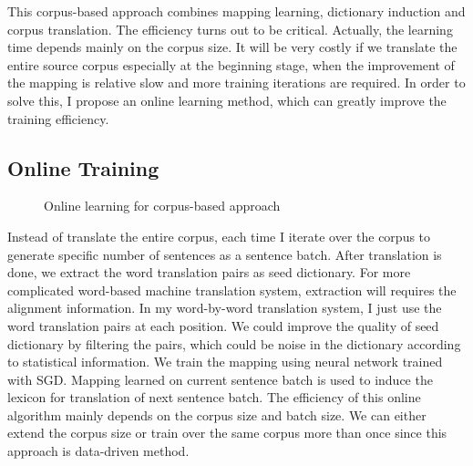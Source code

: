 
This corpus-based approach combines mapping learning, dictionary induction and corpus translation. The efficiency turns out to be critical. Actually, the learning time depends mainly on the corpus size. It will be very costly if we translate the entire source corpus especially at the beginning stage, when the improvement of the mapping is relative slow and more training iterations are required. In order to solve this, I propose an online learning method, which can greatly improve the training efficiency. 

\subsection{Online Training}

\begin{figure}[H]
	\centering
	\begin{minipage}{.7\linewidth}
		\begin{algorithm}[H]
			\SetAlgoLined
			\caption{Online learning for corpus-based approach}
		\end{algorithm}
	\end{minipage}
\end{figure}
Instead of translate the entire corpus, each time I iterate over the corpus to generate specific number of sentences as a sentence batch. After translation is done, we extract the word translation pairs as seed dictionary. For more complicated word-based machine translation system, extraction will requires the alignment information. In my word-by-word translation system, I just use the word translation pairs at each position. We could improve the quality of seed dictionary by filtering the pairs, which could be noise in the dictionary according to statistical information. We train the mapping using neural network trained with SGD. Mapping learned on current sentence batch is used to induce the lexicon for translation of next sentence batch. The efficiency of this online algorithm mainly depends on the corpus size and batch size. We can either extend the corpus size or train over the same corpus more than once since this approach is data-driven method.



